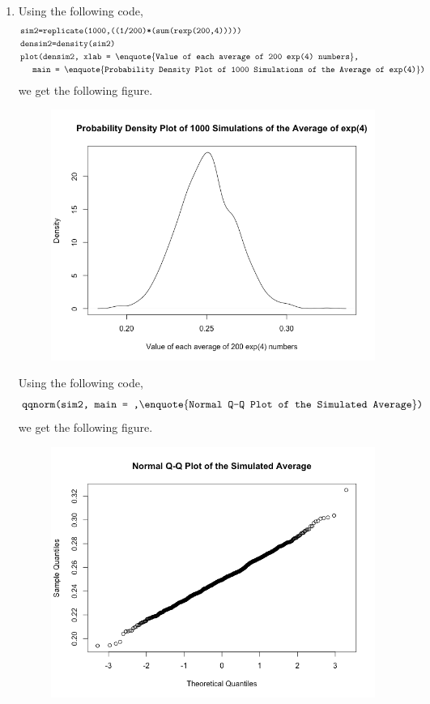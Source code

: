 \documentclass[a4paper]{article}
\newcommand{\code}{\texttt}
\begin{document}
\begin{enumerate}
\begin{enumerate}
		\item Using the following code,
		\begin{align*}
			&\code{sim2=replicate(1000,((1/200)*(sum(rexp(200,4)))))}\\
			&\code{densim2=density(sim2)}\\
			&\code{plot(densim2, xlab = }\text{\enquote{\code{Value of each average of 200 exp(4) numbers}}}\code{,} \\
			& \hspace{5mm}\code{main = }\text{\enquote{\code{Probability Density Plot of 1000 Simulations of the Average of exp(4)}}}\code{)}\\
		\end{align*}
		we get the following figure.
		\begin{figure}[h!]
			\begin{center}
				\includegraphics[width=0.6\linewidth]{b1.png}
			\end{center}
		\end{figure}
		\bigbreak
		Using the following code,
		\begin{align*}
			&\code{qqnorm(sim2, main = ,}\text{\enquote{\code{Normal Q-Q Plot of the Simulated Average}}}\code{)}\\
		\end{align*}
		we get the following figure.
		\begin{figure}[h!]
			\begin{center}
				\includegraphics[width=0.6\linewidth]{b2.png}
			\end{center}
		\end{figure}


\end{enumerate}
\end{enumerate}
\end{document}
